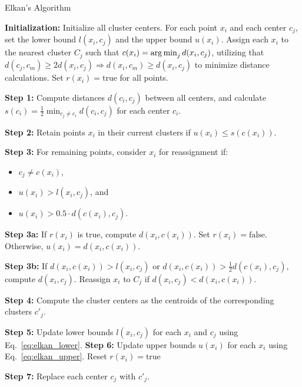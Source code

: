 \begin{algorithm}
	\caption{Elkan's Algorithm}
	\label{alg:elkan}
	\begin{algorithmic}
		\State \textbf{Initialization:} Initialize all cluster centers. For each point $x_i$ and each center $c_j$, set the lower bound $l(x_i,c_j)$ and the upper bound $u(x_i)$. Assign each $x_i$ to the nearest cluster $C_j$ such that $c(x_i) = \operatorname*{arg\,min}_j d(x_i, c_j)$, utilizing that
		$ d(c_j, c_m) \geq 2d(x_i, c_j) \Rightarrow d(x_i, c_m) \geq d(x_i, c_j) $
		to minimize distance calculations. Set $r(x_i) = \text{true}$ for all points.

		\Repeat
		\State \textbf{Step 1:} Compute distances $d(c_i, c_j)$ between all centers, and calculate $s(c_i) = \frac{1}{2} \min_{c_j \neq c_i} d(c_i, c_j)$ for each center $c_i$.

		\State \textbf{Step 2:} Retain points $x_i$ in their current clusters if $u(x_i) \leq s(c(x_i))$.

		\State \textbf{Step 3:} For remaining points, consider $x_i$ for reassignment if:
		\begin{itemize}[leftmargin=5em,itemindent=\algorithmicindent,itemsep=0pt,parsep=0pt]
			\item $c_j \neq c(x_i)$,
			\item $u(x_i) > l(x_i, c_j)$, and
			\item $u(x_i) > 0.5 \cdot d(c(x_i), c_j)$.
		\end{itemize}

		\State \textbf{Step 3a:} If $r(x_i)$ is true, compute $d(x_i, c(x_i))$. Set $r(x_i) = \text{false}$. Otherwise, $u(x_i) = d(x_i, c(x_i))$.

		\State \textbf{Step 3b:} If $d(x_i, c(x_i)) > l(x_i, c_j)$ or $d(x_i, c(x_i)) > \frac{1}{2}d(c(x_i), c_j)$, compute $d(x_i, c_j)$. Reassign $x_i$ to $C_j$ if $d(x_i, c_j) < d(x_i, c(x_i))$.

		\State \textbf{Step 4:} Compute the cluster centers as the centroids of the corresponding clusters $c'_j$.

		\State \textbf{Step 5:} Update lower bounds $l(x_i, c_j)$ for each $x_i$ and $c_j$ using Eq.~\ref{eq:elkan_lower}.
		\State \textbf{Step 6:} Update upper bounds $u(x_i)$ for each $x_i$ using Eq.~\ref{eq:elkan_upper}. Reset $r(x_i) = \text{true}$

		\State \textbf{Step 7:} Replace each center $c_j$ with $c'_j$.
	\end{algorithmic}
\end{algorithm}

